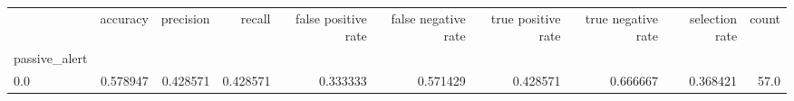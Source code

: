\begin{tabular}{lrrrrrrrrr}
\toprule
{} &  accuracy &  precision &    recall &  false positive rate &  false negative rate &  true positive rate &  true negative rate &  selection rate &  count \\
passive\_alert &           &            &           &                      &                      &                     &                     &                 &        \\
\midrule
0.0           &  0.578947 &   0.428571 &  0.428571 &             0.333333 &             0.571429 &            0.428571 &            0.666667 &        0.368421 &   57.0 \\
\bottomrule
\end{tabular}
